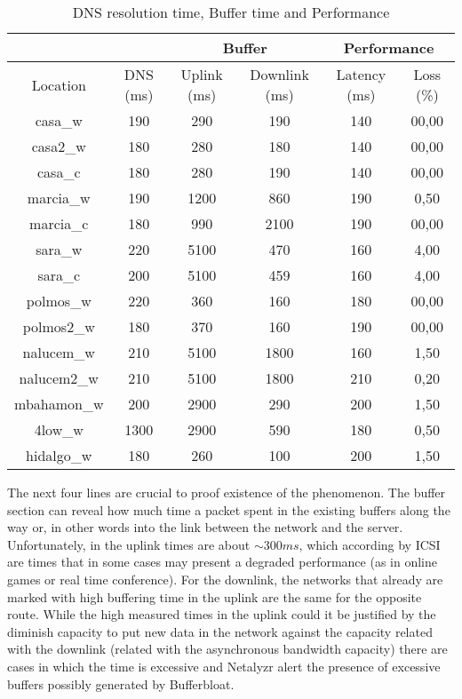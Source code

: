 \begin{table}[ht]
\begin{center}
\begin{tabular}{|c||c||c|c||c|c||}
 \hline
& & \multicolumn{2}{|c||}{Buffer} & \multicolumn{2}{|c||}{Performance} \\ \hline
Location	& DNS (ms) 	& Uplink (ms)	& Downlink (ms) & Latency (ms)	& Loss (\%) \\ \hline \hline
casa\_w		& 190		& 290			& 190 			& 140			& 00,00		\\ \hline
casa2\_w	& 180		& 280			& 180 			& 140			& 00,00		\\ \hline
casa\_c		& 180		& 280			& 190			& 140			& 00,00		\\ \hline
marcia\_w	& 190		& 1200			& 860			& 190			& 0,50 		\\ \hline
marcia\_c	& 180		& 990			& 2100			& 190			& 00,00		\\ \hline
sara\_w		& 220		& 5100			& 470			& 160			& 4,00 		\\ \hline
sara\_c		& 200		& 5100			& 459			& 160			& 4,00 		\\ \hline
polmos\_w	& 220		& 360			& 160			& 180			& 00,00		\\ \hline
polmos2\_w	& 180		& 370			& 160			& 190			& 00,00		\\ \hline
nalucem\_w	& 210		& 5100			& 1800			& 160			& 1,50 		\\ \hline
nalucem2\_w	& 210		& 5100			& 1800			& 210			& 0,20 		\\ \hline
mbahamon\_w	& 200		& 2900			& 290			& 200			& 1,50 		\\ \hline
4low\_w		& 1300		& 2900			& 590			& 180			& 0,50 		\\ \hline
hidalgo\_w	& 180		& 260			& 100			& 200			& 1,50 		\\ \hline
\end{tabular}
\caption[Netalyzr Test:DNS resolution time, Buffer time and Performance]{DNS resolution time, Buffer time and Performance}
\label{table:buffer}
\end{center}
\end{table}

The next four lines are crucial to proof existence of the phenomenon. The
buffer section can reveal how much time a packet spent in the existing buffers
along the way or, in other words into the link between the network and the
server. Unfortunately, in the uplink times are about $\sim300ms$, which
according by ICSI are times that in some cases may present a degraded
performance (as in online games or real time conference). For the downlink,
the networks that already are marked with high buffering time in the uplink
are the same for the opposite route. While the high measured times in the
uplink could it be justified by the diminish capacity to put new data in the
network against the capacity related with the downlink (related with the
asynchronous bandwidth capacity) there are cases in which the time is
excessive and Netalyzr alert the presence of excessive buffers possibly
generated by Bufferbloat.

